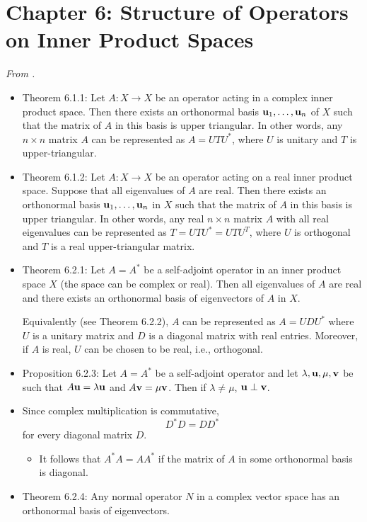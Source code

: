 \documentclass[../../notes.tex]{subfiles}
\begin{document}
\section{Chapter 6: Structure of Operators on Inner Product Spaces}
\emph{From \textcite{bib:Treil}.}
\begin{itemize}
    \item {}Theorem 6.1.1: Let $A:X\to X$ be an operator acting in a complex inner product space. Then there exists an orthonormal basis $\mathbf{u}_1,\dots,\mathbf{u}_n$ of $X$ such that the matrix of $A$ in this basis is upper triangular. In other words, any $n\times n$ matrix $A$ can be represented as $A=UTU^*$, where $U$ is unitary and $T$ is upper-triangular.
    \item Theorem 6.1.2: Let $A:X\to X$ be an operator acting on a real inner product space. Suppose that all eigenvalues of $A$ are real. Then there exists an orthonormal basis $\mathbf{u}_1,\dots,\mathbf{u}_n$ in $X$ such that the matrix of $A$ in this basis is upper triangular. In other words, any real $n\times n$ matrix $A$ with all real eigenvalues can be represented as $T=UTU^*=UTU^T$, where $U$ is orthogonal and $T$ is a real upper-triangular matrix.
    \item Theorem 6.2.1: Let $A=A^*$ be a self-adjoint operator in an inner product space $X$ (the space can be complex or real). Then all eigenvalues of $A$ are real and there exists an orthonormal basis of eigenvectors of $A$ in $X$.\par
    Equivalently (see Theorem 6.2.2), $A$ can be represented as $A=UDU^*$ where $U$ is a unitary matrix and $D$ is a diagonal matrix with real entries. Moreover, if $A$ is real, $U$ can be chosen to be real, i.e., orthogonal.
    \item Proposition 6.2.3: Let $A=A^*$ be a self-adjoint operator and let $\lambda,\mathbf{u},\mu,\mathbf{v}$ be such that $A\mathbf{u}=\lambda\mathbf{u}$ and $A\mathbf{v}=\mu\mathbf{v}$. Then if $\lambda\neq\mu$, $\mathbf{u}\perp\mathbf{v}$.
    \item Since complex multiplication is commutative,
    \begin{equation*}
        D^*D = DD^*
    \end{equation*}
    for every diagonal matrix $D$.
    \begin{itemize}
        \item It follows that $A^*A=AA^*$ if the matrix of $A$ in some orthonormal basis is diagonal.
    \end{itemize}
    \item Theorem 6.2.4: Any normal operator $N$ in a complex vector space has an orthonormal basis of eigenvectors.\par

\end{itemize}
\end{document}
